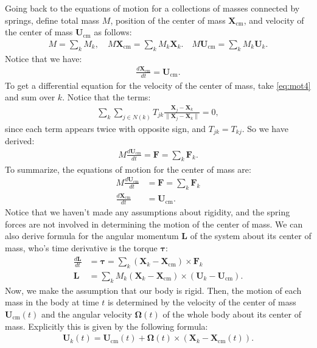 \documentclass[10pt]{article}
\newcommand{\bs}[1]{{\boldsymbol #1}}
\begin{document}
Going back to the equations of motion for a collections of masses connected by springs, define total mass $M$, position of the center of mass ${\bs X}_\text{cm}$, and velocity of the center of mass ${\bs U}_\text{cm}$ as follows:
\begin{align*}
M = \sum_k M_k, \quad M {\bs X}_\text{cm} = \sum_k M_k {\bs X}_k. \quad M {\bs U}_\text{cm} = \sum_k M_k {\bs U}_k.
\end{align*}
Notice that we have:
\begin{align*}
\frac{d {\bs X}_\text{cm}}{dt} = {\bs U}_\text{cm}.
\end{align*}
To get a differential equation for the velocity of the center of mass, take \eqref{eq:mot4} and sum over $k$.  Notice that the terms:
\begin{align*}
\sum_k \sum_{j \in N(k)} T_{jk} \frac{{\bs X}_j - {\bs X}_k}{\| {\bs X}_j - {\bs X}_k \|} = 0,
\end{align*}
since each term appears twice with opposite sign, and $T_{jk} = T_{kj}$.  So we have derived:
\begin{align*}
M\frac{d {\bs U}_\text{cm}}{dt} = {\bs F} = \sum_k {\bs F}_k.
\end{align*}
To summarize, the equations of motion for the center of mass are:
\begin{align}
\label{eq:rigmot1}
M\frac{d {\bs U}_\text{cm}}{dt} &= {\bs F} = \sum_k {\bs F}_k \\
\label{eq:rigmot2}
\frac{d {\bs X}_\text{cm}}{dt} &= {\bs U}_\text{cm}.
\end{align}
Notice that we haven't made any assumptions about rigidity, and the spring forces are not involved in determining the motion of the center of mass.  We can also derive formula for the angular momentum ${\bs L}$ of the system about its center of mass, who's time derivative is the torque ${\bs \tau}$:
\begin{align*}
\frac{d {\bs L}}{dt} &= {\bs \tau} = \sum_k ({\bs X}_k - {\bs X}_\text{cm}) \times {\bs F}_k \\
{\bs L} &= \sum_k M_k ({\bs X}_k - {\bs X}_\text{cm}) \times ({\bs U}_k - {\bs U}_\text{cm}).
\end{align*}
Now, we make the assumption that our body is rigid.  Then, the motion of each mass in the body at time $t$ is determined by the velocity of the center of mass ${\bs U}_\text{cm}(t)$ and the angular velocity ${\bs \Omega}(t)$ of the whole body about its center of mass.  Explicitly this is given by the following formula:
\begin{align}
\label{eq:rigmot3}
{\bs U}_k(t) = {\bs U}_\text{cm}(t) + {\bs \Omega}(t) \times ({\bs X}_k - {\bs X}_\text{cm}(t)).
\end{align}  
\end{document}
